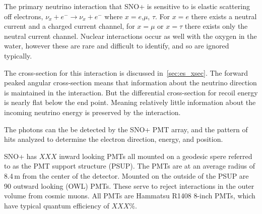 The primary neutrino interaction that SNO+ is sensitive to is elastic scattering
off electrons,
$\nu_{x} + e^{-} \rightarrow \nu_{x} + e^{-}$
where $x=e$,$\mu$, $\tau$.
For $x=e$ there exists a neutral current and a charged current channel,
for $x=\mu$ or $x=\tau$ there exists only the neutral current channel.
Nuclear interactions occur as well with the oxygen in the water,
however these are rare and difficult to identify, and so are ignored typically.

The cross-section for this interaction is discussed in~\ref{sec:es_xsec}.
The forward peaked angular cross-section means that information about the
neutrino direction is maintained in the interaction.
But the differential cross-section for recoil energy is nearly flat below the
end point. Meaning relatively little information about the incoming neutrino energy
is preserved by the interaction.



The photons can the be detected by the SNO+ PMT array, and the pattern
of hits analyzed to determine the electron direction, energy, and position.

SNO+ has $XXX$ inward looking PMTs all mounted on a geodesic spere referred to as
the PMT support structure (PSUP). The PMTs are at an average radius of 8.4\,m from
the center of the detector.
Mounted on the outside of the PSUP are 90 outward looking (OWL) PMTs.
These serve to reject interactions in the outer volume from cosmic muons.
All PMTs are Hammatsu R1408 8-inch PMTs, which have typical quantum efficiency
of  $XXX$\%.


